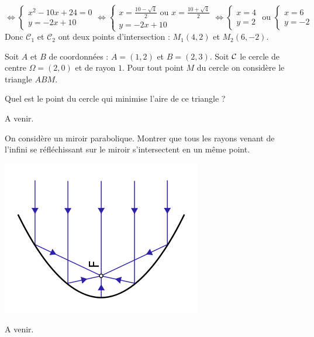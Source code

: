 \documentclass[a4paper, 11pt]{article}
\begin{document}
\begin{correction}
\begin{enumerate}
		      $$ \iff \begin{cases} x^2-10x+24=0 \\ y=-2x+10 \end{cases} \iff \begin{cases} x=\frac{10-\sqrt{4}}{2} \text{ ou } x=\frac{10+\sqrt{4}}{2} \\ y=-2x+10 \end{cases} \iff \begin{cases} x=4 \\ y=2 \end{cases} \text{ ou } \begin{cases} x=6 \\ y=-2 \end{cases} $$
		      Donc $\mathcal{C}_1$ et $\mathcal{C}_2$ ont deux points d'intersection : $M_1\left(4,2\right)$ et $M_2\left(6,-2\right)$.
	\end{enumerate}
\end{correction}


\begin{exercice}
	Soit $A$ et $B$ de coordonnées : $A= (1,2)$ et $B=(2,3)$.
	Soit $\mathcal{C}$ le cercle de centre $\Omega=(2,0)$ et de rayon $1$. Pour tout point $M$ du cercle on considère le triangle $ABM$.

	Quel est le point du cercle qui minimise l'aire de ce triangle ?
\end{exercice}
\begin{correction}
	A venir.
\end{correction}



\begin{exercice}
	On considère un miroir parabolique. Montrer que tous les rayons venant de l'infini se réfléchissant sur le miroir s'intersectent en un même point.

	\begin{center}
		\includegraphics[scale=0.4]{parabolique.png}
	\end{center}
\end{exercice}
\begin{correction}
	A venir.
\end{correction}
\end{document}
